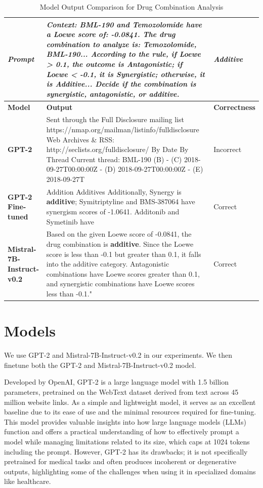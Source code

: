 \documentclass[11pt]{article}
\begin{document}
\begin{table}[ht] %
\centering
\caption{Model Output Comparison for Drug Combination Analysis}
\begin{tabular}{|p{}|p{}|p{}|}
\hline
\textbf{\textit{Prompt}} & \textit{\textbf{Context:} BML-190 and Temozolomide have a Loewe score of: -0.0841. The drug combination to analyze is: Temozolomide, BML-190... According to the rule, if Loewe > 0.1, the outcome is Antagonistic; if Loewe < -0.1, it is Synergistic; otherwise, it is Additive... Decide if the combination is synergistic, antagonistic, or additive.} & \textit{Additive} \\
\hline
\textbf{Model} & \textbf{Output} & \textbf{Correctness} \\
\hline
\textbf{GPT-2} & Sent through the Full Disclosure mailing list https://nmap.org/mailman/listinfo/fulldisclosure Web Archives \& RSS: http://seclists.org/fulldisclosure/ By Date By Thread Current thread: BML-190 (B) - (C) 2018-09-27T00:00:00Z - (D) 2018-09-27T00:00:00Z - (E) 2018-09-27T & Incorrect \\
\hline
\textbf{GPT-2 Fine-tuned} & Addition Additives Additionally, Synergy is \textbf{additive}; Symitriptyline and BMS-387064 have synergism scores of -1.0641. Additonib and Symetinib have & Correct \\
\hline
\textbf{Mistral-7B-Instruct-v0.2} & Based on the given Loewe score of -0.0841, the drug combination is \textbf{additive}. Since the Loewe score is less than -0.1 but greater than 0.1, it falls into the additive category. Antagonistic combinations have Loewe scores greater than 0.1, and synergistic combinations have Loewe scores less than -0.1." & Correct \\
\hline
\end{tabular}
\end{table}

\section{Models}
We use GPT-2 \cite{radford2019language} and Mistral-7B-Instruct-v0.2 \cite{jiang2023mistral} in our experiments. We then finetune both the GPT-2 and Mistral-7B-Instruct-v0.2 model.

Developed by OpenAI, GPT-2 is a large language model with 1.5 billion parameters, pretrained on the WebText dataset derived from text across 45 million website links. As a simple and lightweight model, it serves as an excellent baseline due to its ease of use and the minimal resources required for fine-tuning. This model provides valuable insights into how large language models (LLMs) function and offers a practical understanding of how to effectively prompt a model while managing limitations related to its size, which caps at 1024 tokens including the prompt. However, GPT-2 has its drawbacks; it is not specifically pretrained for medical tasks and often produces incoherent or degenerative outputs, highlighting some of the challenges when using it in specialized domains like healthcare.
\end{document}
